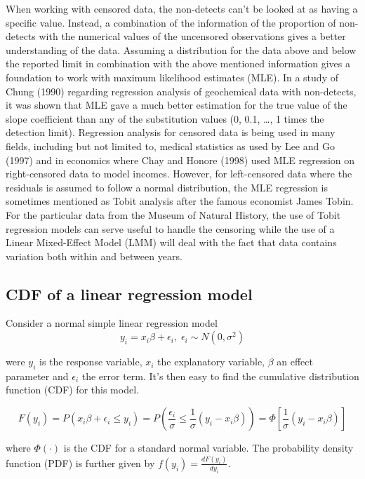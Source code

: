 \documentclass[]{article}
\begin{document}
When working with censored data, the non-detects can't be looked at as
having a specific value. Instead, a combination of the information of
the proportion of non-detects with the numerical values of the
uncensored observations gives a better understanding of the data.
Assuming a distribution for the data above and below the reported limit
in combination with the above mentioned information gives a foundation
to work with maximum likelihood estimates (MLE). In a study of Chung
(1990) regarding regression analysis of geochemical data with
non-detects, it was shown that MLE gave a much better estimation for the
true value of the slope coefficient than any of the substitution values
(0, 0.1, \ldots, 1 times the detection limit). Regression analysis for
censored data is being used in many fields, including but not limited
to, medical statistics as used by Lee and Go (1997) and in economics
where Chay and Honore (1998) used MLE regression on right-censored data
to model incomes. However, for left-censored data where the residuals is
assumed to follow a normal distribution, the MLE regression is sometimes
mentioned as Tobit analysis after the famous economist James Tobin. For
the particular data from the Museum of Natural History, the use of Tobit
regression models can serve useful to handle the censoring while the use
of a Linear Mixed-Effect Model (LMM) will deal with the fact that data
contains variation both within and between years.

\hypertarget{cdf-of-a-linear-regression-model}{%
\subsection{CDF of a linear regression
model}\label{cdf-of-a-linear-regression-model}}

Consider a normal simple linear regression model \[
y_i = x_i \beta + \epsilon_i, \; \epsilon_i \sim N(0,\sigma^2)
\]

were \(y_i\) is the response variable, \(x_i\) the explanatory variable,
\(\beta\) an effect parameter and \(\epsilon_i\) the error term. It's
then easy to find the cumulative distribution function (CDF) for this
model.

\[
F(y_i) = P(x_i\beta+\epsilon_i\leq y_i) = P(\frac{\epsilon_i}{\sigma}\leq \frac{1}{\sigma}(y_i-x_i\beta)) = \Phi[\frac{1}{\sigma}(y_i-x_i\beta)]
\]

where \(\Phi(\cdot)\) is the CDF for a standard normal variable. The
probability density function (PDF) is further given by
\(f(y_i)=\frac{dF(y_i)}{dy_i}\).
\end{document}
